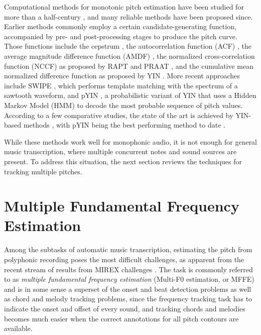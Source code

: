 
Computational methods for monotonic pitch estimation have been studied for more than a half-century \cite{noll1967cepstrum}, and many reliable methods have been proposed since.
Earlier methods commonly employ a certain candidate-generating function, accompanied by pre- and post-processing stages to produce the pitch curve.
Those functions include the cepstrum \cite{noll1967cepstrum}, the autocorrelation function (ACF) \cite{dubnowski1976acf}, the average magnitude difference function (AMDF) \cite{ross1974amdf}, the normalized cross-correlation function (NCCF) as proposed by RAPT \cite{talkin1995rapt} and PRAAT \cite{boersma1993praat}, and the cumulative mean normalized difference function as proposed by YIN \cite{decheveigne2002yin}. More recent approaches include SWIPE \cite{camacho2008swipe}, which performs template matching with the spectrum of a sawtooth waveform, and 
pYIN \cite{mauch2014pyin}, a probabilistic variant of YIN that uses a Hidden Markov Model (HMM) to decode the most probable sequence of pitch values.
According to a few comparative studies, the state of the art is achieved by YIN-based methods \cite{von2010comparison, babacan2013comparative}, with pYIN being the best performing method to date \cite{mauch2014pyin}.

While these methods work well for monophonic audio, it is not enough for general music transcription, where multiple concurrent notes and sound sources are present.
To address this situation, the next section reviews the techniques for tracking multiple pitches.


\section{Multiple Fundamental Frequency Estimation}

Among the subtasks of automatic music transcription, estimating the pitch from polyphonic recording poses the most difficult challenges, as apparent from the recent stream of results from MIREX challenges \cite{downie2014mirex}.
The task is commonly referred to as \emph{multiple fundamental frequency estimation} (Multi-F0 estimation, or MFFE) and is in some sense a superset of the onset and beat detection problems as well as chord and melody tracking problems,
since the frequency tracking task has to indicate the onset and offset of every sound, and tracking chords and melodies becomes much easier when the correct annotations for all pitch contours are available.

